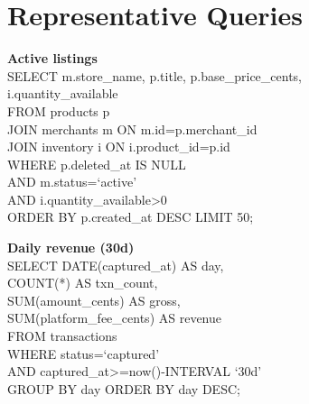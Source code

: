 \section{Representative Queries}

\begin{minipage}{0.48\textwidth}
  \begin{tcolorbox}[colback=bglight,colframe=accent!40,sharp corners,boxrule=0.3pt,
    left=2mm,right=2mm,top=1.5mm,bottom=1.5mm,before skip=1pt,after skip=0pt]
    {\fontsize{6.5}{8}\selectfont\color{primary}\textbf{Active listings}}\\[0.5pt]
    {\fontsize{5.5}{7}\selectfont\ttfamily
      SELECT m.store\_name, p.title, p.base\_price\_cents,\\
      \quad i.quantity\_available\\
      \quad FROM products p\\
      \quad JOIN merchants m ON m.id=p.merchant\_id\\
      \quad JOIN inventory i ON i.product\_id=p.id\\
      \quad WHERE p.deleted\_at IS NULL\\
      \qquad AND m.status=`active'\\
      \qquad AND i.quantity\_available>0\\
      \quad ORDER BY p.created\_at DESC LIMIT 50;
    }
  \end{tcolorbox}
\end{minipage}
\par
\begin{minipage}{0.48\textwidth}
  \begin{tcolorbox}[colback=bglight,colframe=accent!40,sharp corners,boxrule=0.3pt,
    left=2mm,right=2mm,top=1.5mm,bottom=1.5mm,before skip=1pt,after skip=0pt]
    {\fontsize{6.5}{8}\selectfont\color{primary}\textbf{Daily revenue (30d)}}\\[0.5pt]
    {\fontsize{5.5}{7}\selectfont\ttfamily
      SELECT DATE(captured\_at) AS day,\\
      \quad COUNT(*) AS txn\_count,\\
      \quad SUM(amount\_cents) AS gross,\\
      \quad SUM(platform\_fee\_cents) AS revenue\\
      \quad FROM transactions\\
      \quad WHERE status=`captured'\\
      \qquad AND captured\_at>=now()-INTERVAL `30d'\\
      \quad GROUP BY day ORDER BY day DESC;
    }
  \end{tcolorbox}
\end{minipage}
\par

